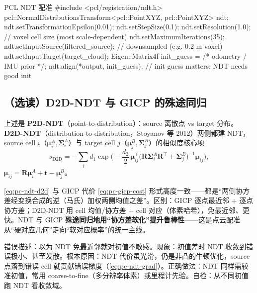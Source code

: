 \begin{codebox}[C++]{PCL NDT 配准}
#include <pcl/registration/ndt.h>
pcl::NormalDistributionsTransform<pcl::PointXYZ, pcl::PointXYZ> ndt;
ndt.setTransformationEpsilon(0.01);
ndt.setStepSize(0.1);
ndt.setResolution(1.0);          // voxel cell size (most scale-dependent)
ndt.setMaximumIterations(35);
ndt.setInputSource(filtered_source);   // downsampled (e.g. 0.2 m voxel)
ndt.setInputTarget(target_cloud);
Eigen::Matrix4f init_guess = /* odometry / IMU prior */;
ndt.align(*output, init_guess);  // init guess matters: NDT needs good init
\end{codebox}

\subsection{（选读）D2D-NDT 与 GICP 的殊途同归}
\label{sec:pc-ndt-d2d}

上述是 \textbf{P2D-NDT}（point-to-distribution）：source 离散点 vs target 分布。\textbf{D2D-NDT}（distribution-to-distribution，Stoyanov 等 2012）两侧都建 NDT，source cell $i$（$\boldsymbol{\mu}_i^A,\boldsymbol{\Sigma}_i^A$）与 target cell $j$（$\boldsymbol{\mu}_j^B,\boldsymbol{\Sigma}_j^B$）的相似度核心项
\begin{equation}
  s_{\text{D2D}}=-\sum_{i}d_1\exp\!\Big(-\frac{d_2}{2}\,\boldsymbol{\mu}_{ij}^\top\big(\mathbf{R}\boldsymbol{\Sigma}_i^A\mathbf{R}^\top+\boldsymbol{\Sigma}_j^B\big)^{-1}\boldsymbol{\mu}_{ij}\Big),
  \label{eq:pc-ndt-d2d}
\end{equation}
$\boldsymbol{\mu}_{ij}=\mathbf{R}\boldsymbol{\mu}_i^A+\mathbf{t}-\boldsymbol{\mu}_j^B$。

\begin{insight}
\cref{eq:pc-ndt-d2d} 与 GICP 代价 \cref{eq:pc-gicp-cost} 形式高度一致——都是“两侧协方差经变换合成的逆（马氏）加权两侧均值之差”。区别：GICP 逐点最近邻 + 逐点协方差；D2D-NDT 用 cell 均值/协方差 + cell 对应（体素哈希），免最近邻、更快。NDT 与 GICP \textbf{殊途同归地用“协方差软化”提升鲁棒性}——这是点云配准从“硬对应几何”走向“软对应概率”的统一主线。
\end{insight}

\begin{pitfall}
错误描述：以为 NDT 免最近邻就对初值不敏感。现象：初值差时 NDT 收敛到错误极小、甚至发散。根本原因：NDT 代价虽光滑，仍是非凸的牛顿优化，source 点落到错误 cell 就贡献错误梯度（\cref{eq:pc-ndt-grad}）。正确做法：NDT 同样需较准初值，常用 coarse-to-fine（多分辨率体素）或里程计先验。自检：从不同初值跑 NDT 看收敛域。
\end{pitfall}

